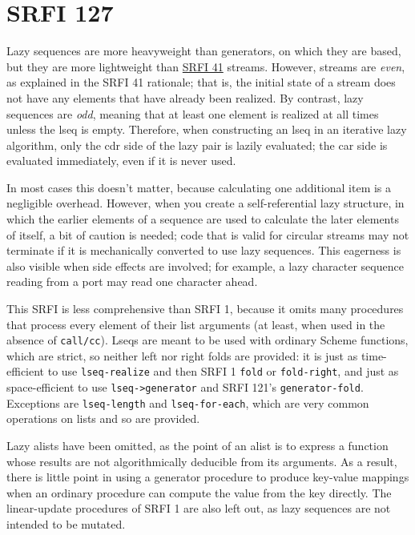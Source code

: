 \section{SRFI 127}

Lazy sequences are more heavyweight than generators, on which they are
based, but they are more lightweight than
\href{http://srfi.schemers.org/srfi-41/srfi-41.html}{SRFI 41} streams.
However, streams are \emph{even}, as explained in the SRFI 41 rationale;
that is, the initial state of a stream does not have any elements that
have already been realized. By contrast, lazy sequences are \emph{odd},
meaning that at least one element is realized at all times unless the
lseq is empty. Therefore, when constructing an lseq in an iterative lazy
algorithm, only the cdr side of the lazy pair is lazily evaluated; the
car side is evaluated immediately, even if it is never used.

In most cases this doesn't matter, because calculating one additional
item is a negligible overhead. However, when you create a
self-referential lazy structure, in which the earlier elements of a
sequence are used to calculate the later elements of itself, a bit of
caution is needed; code that is valid for circular streams may not
terminate if it is mechanically converted to use lazy sequences. This
eagerness is also visible when side effects are involved; for example, a
lazy character sequence reading from a port may read one character
ahead.

This SRFI is less comprehensive than SRFI 1, because it omits many
procedures that process every element of their list arguments (at least,
when used in the absence of \texttt{call/cc}). Lseqs are meant to be
used with ordinary Scheme functions, which are strict, so neither left
nor right folds are provided: it is just as time-efficient to use
\texttt{lseq-realize} and then SRFI 1 \texttt{fold} or
\texttt{fold-right}, and just as space-efficient to use
\texttt{lseq-\textgreater{}generator} and SRFI 121's
\texttt{generator-fold}. Exceptions are \texttt{lseq-length} and
\texttt{lseq-for-each}, which are very common operations on lists and so
are provided.

Lazy alists have been omitted, as the point of an alist is to express a
function whose results are not algorithmically deducible from its
arguments. As a result, there is little point in using a generator
procedure to produce key-value mappings when an ordinary procedure can
compute the value from the key directly. The linear-update procedures of
SRFI 1 are also left out, as lazy sequences are not intended to be
mutated.